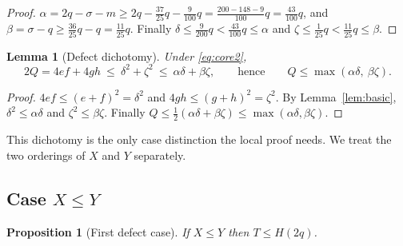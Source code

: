 \documentclass[11pt]{amsart}
\newtheorem{lemma}[theorem]{Lemma}
\newtheorem{proposition}[theorem]{Proposition}
\theoremstyle{definition}
\theoremstyle{remark}
\begin{document}
\begin{proof}
$\alpha=2q-\sigma-m\ge2q-\frac{37}{25}q-\frac{9}{100}q=\frac{200-148-9}{100}q=\frac{43}{100}q$, and $\beta=\sigma-q\ge\frac{36}{25}q-q=\frac{11}{25}q$. Finally $\delta\le\frac{9}{200}q<\frac{43}{100}q\le\alpha$ and $\zeta\le\frac1{25}q<\frac{11}{25}q\le\beta$.
\end{proof}

\begin{lemma}[Defect dichotomy]\label{lem:dichotomy}
Under \eqref{eq:core2},
\begin{equation}\label{eq:dicho}
2Q=4ef+4gh\ \le\ \delta^2+\zeta^2\ \le\ \alpha\delta+\beta\zeta,
\qquad\text{hence}\qquad
Q\le\max(\alpha\delta,\ \beta\zeta).
\end{equation}
\end{lemma}

\begin{proof}
$4ef\le(e+f)^2=\delta^2$ and $4gh\le(g+h)^2=\zeta^2$. By Lemma~\ref{lem:basic}, $\delta^2\le\alpha\delta$ and $\zeta^2\le\beta\zeta$. Finally $Q\le\frac12(\alpha\delta+\beta\zeta)\le\max(\alpha\delta,\beta\zeta)$.
\end{proof}

This dichotomy is the only case distinction the local proof needs. We treat the two orderings of $X$ and $Y$ separately.

\subsection{Case \texorpdfstring{$X\le Y$}{X <= Y}}\label{ssec:caseA}

\begin{proposition}[First defect case]\label{prop:caseA}
If $X\le Y$ then $T\le H(2q)$.
\end{proposition}
\end{document}
